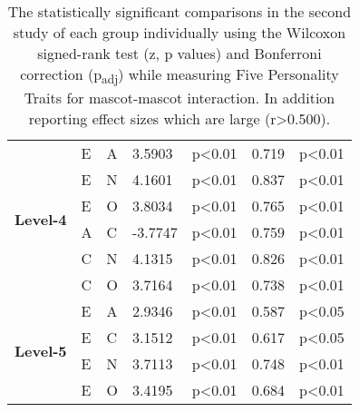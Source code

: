 \begin{table}
\begin{center}
\begin{tabular}{ |p{1.3cm}| p{0.5cm}|p{0.5cm}|p{1.2cm}| p{1.7cm}|p{1cm}|p{1.5cm}|  }
            \multirow{6}{*}{\textbf{Level-4}}
            &E &A &3.5903 &p<0.01 &0.719 &p<0.01\\
            &E &N &4.1601 &p<0.01 &0.837 &p<0.01\\
            &E &O &3.8034 &p<0.01 &0.765 &p<0.01\\
            &A &C &-3.7747 &p<0.01 &0.759 &p<0.01\\
            &C &N &4.1315 &p<0.01 &0.826 &p<0.01\\
            &C &O &3.7164 &p<0.01 &0.738 &p<0.01\\
            \hline
            \hline
            \multirow{4}{*}{\textbf{Level-5}}
            &E &A &2.9346 &p<0.01 &0.587 &p<0.05\\
            &E &C &3.1512 &p<0.01 &0.617 &p<0.05\\
            &E &N &3.7113 &p<0.01 &0.748 &p<0.01\\
            &E &O &3.4195 &p<0.01 &0.684 &p<0.01\\
            \hline
        \end{tabular}
    \end{center}
    \captionsetup{width=13.5cm}
    \caption{The statistically significant comparisons in the second study of each group individually using the
    Wilcoxon signed-rank test (z, p values) and Bonferroni correction (p\textsubscript{adj}) while measuring Five Personality
    Traits for mascot-mascot interaction.
    In addition reporting effect sizes which are large (r>0.500).}
    \label{table:wilcoxMM2}
\end{table}

